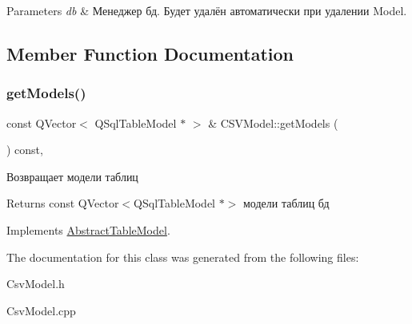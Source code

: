 \begin{DoxyParams}{Parameters}
{\em db} & Менеджер бд. Будет удалён автоматически при удалении Model. \\
\hline
\end{DoxyParams}


\subsection{Member Function Documentation}
\mbox{\label{class_c_s_v_model_adf61a056aa4dcb63471cb982a6f24e46}} 
\subsubsection{\texorpdfstring{get\+Models()}{getModels()}}
{\footnotesize\ttfamily const Q\+Vector$<$ Q\+Sql\+Table\+Model $\ast$ $>$ \& C\+S\+V\+Model\+::get\+Models (\begin{DoxyParamCaption}{ }\end{DoxyParamCaption}) const\hspace{0.3cm}{\ttfamily [override]}, {\ttfamily [virtual]}}



Возвращает модели таблиц 

\begin{DoxyReturn}{Returns}
const Q\+Vector$<$\+Q\+Sql\+Table\+Model $\ast$$>$ модели таблиц бд 
\end{DoxyReturn}


Implements \mbox{\hyperlink{class_abstract_table_model_ac0e21bec862902ff88251c8880ec5014}{Abstract\+Table\+Model}}.



The documentation for this class was generated from the following files\+:\begin{DoxyCompactItemize}
\item 
Csv\+Model.\+h\item 
Csv\+Model.\+cpp\end{DoxyCompactItemize}
